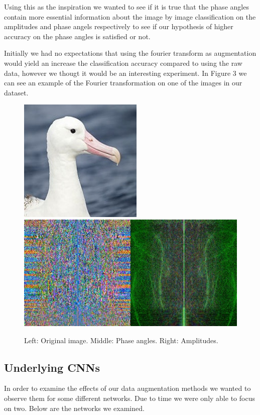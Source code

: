 \documentclass{article}
\begin{document}
Using this as the inspiration we wanted to see if it is true that the phase angles contain more essential information about the image by image classification on the amplitudes 
and phase angels respectively to see if our hypothesis of higher accuracy on the phase angles is satisfied or not. 

Initially we had no expectations that using the fourier transform as augmentation would yield an increase the classification accuracy compared to using 
the raw data, however we thougt it would be an interesting experiment. 
In Figure 3 we can see an example of the Fourier transformation on one of the images in our dataset. 

\begin{figure}[!htb]
	\raggedleft
	\includegraphics[scale=0.30]{fourier1}
	\endminipage
	\raggedleft
	\includegraphics[trim=0cm 0cm 0cm 0cm, scale=0.30]{fourier2}
	\endminipage
	\caption{Left: Original image. Middle: Phase angles. Right: Amplitudes.}
\end{figure}

\subsection{Underlying CNNs}

In order to examine the effects of our data augmentation methods we wanted to observe them for some different networks. Due to time we were only able to focus on two. Below are the networks we examined.
\end{document}
